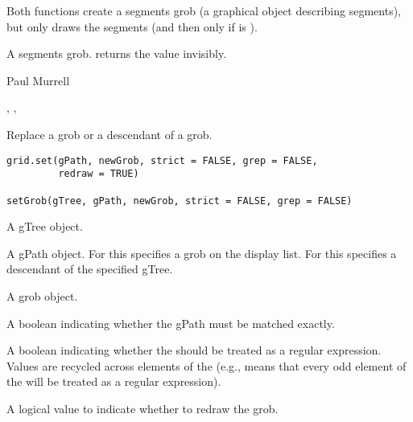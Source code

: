 %
\begin{Details}\relax
Both functions create a segments grob (a graphical object describing
segments), but only 
draws the segments (and then only if  is ).

\end{Details}
%
\begin{Value}
A segments grob.   returns the value invisibly.
\end{Value}
%
\begin{Author}\relax
Paul Murrell
\end{Author}
%
\begin{SeeAlso}\relax
{},
,
\end{SeeAlso}
%
\begin{Description}\relax
Replace a grob or a descendant of a grob.

\end{Description}
%
\begin{Usage}
\begin{verbatim}
grid.set(gPath, newGrob, strict = FALSE, grep = FALSE,
         redraw = TRUE)
 
setGrob(gTree, gPath, newGrob, strict = FALSE, grep = FALSE) 
\end{verbatim}
\end{Usage}
%
\begin{Arguments}
\begin{ldescription}
\item[\code{gTree}] A gTree object.
\item[\code{gPath}]  A gPath object. For  this
specifies a grob on the display list.  For  this
specifies a descendant of the specified gTree. 
\item[\code{newGrob}]  A grob object. 
\item[\code{strict}]  A boolean indicating whether the gPath must be
matched exactly. 
\item[\code{grep}] A boolean indicating whether the  should
be treated as a regular expression.  Values are recycled across
elements of the  (e.g.,  means
that every odd element of the  will be treated as
a regular expression).

\item[\code{redraw}] A logical value to indicate whether to redraw the grob. 
\end{ldescription}
\end{Arguments}
